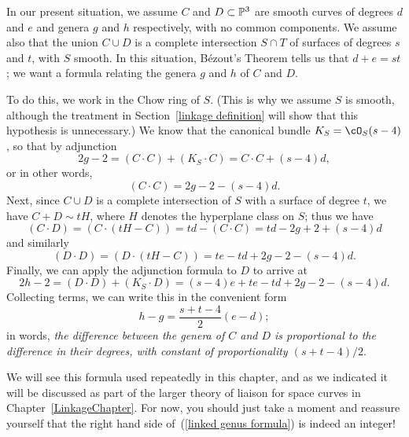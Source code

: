 In our present situation, we assume $C$ and $D \subset \PP^3$ are smooth curves of degrees $d$ and $e$ and genera $g$ and $h$ respectively, with no common components. We assume also that the union $C \cup D$ is a complete intersection $S \cap T$ of surfaces of degrees $s$ and $t$, with $S$ smooth. In this situation, B\'ezout's Theorem tells us that $d+e = st$; we want a formula relating the genera $g$ and $h$ of $C$ and $D$.

To do this, we work in the Chow ring of $S$. (This is why we assume $S$ is smooth, although the treatment in Section~\ref{linkage definition} will show that this hypothesis is unnecessary.) We know that the canonical bundle $K_S = \cO_S(s-4)$, so that by adjunction 
$$
2g-2 = (C\cdot C) + (K_S\cdot C) = C\cdot C + (s-4)d, 
$$
or in other words,
$$
(C \cdot C) = 2g-2 - (s-4)d.
$$
Next, since $C \cup D$ is a complete intersection of $S$ with a surface of degree $t$, we have $C + D\sim tH$, where $H$ denotes the hyperplane class on $S$; thus we have
$$
(C \cdot D) = (C \cdot (tH - C)) = td - (C \cdot C) = td - 2g + 2 + (s-4)d
$$
and similarly
$$
(D \cdot D) = (D \cdot (tH - C)) = te - td + 2g - 2 - (s-4)d.
$$
Finally, we can apply the adjunction formula to $D$ to arrive at
$$
2h - 2 = (D \cdot D) + (K_S \cdot D) = (s-4)e  + te - td + 2g - 2 - (s-4)d.
$$
Collecting terms, we can write this in the convenient form
\begin{equation}\label{linked genus formula}
h - g = \frac{s+t-4}{2}(e-d);
\end{equation}
in words, \emph{the difference between the genera of $C$ and $D$ is proportional to the difference in their degrees, with constant of proportionality $(s+t-4)/2$}. 

We will see this formula used repeatedly in this chapter, and as we indicated it will be discussed as part of the larger theory of liaison for space curves in Chapter~\ref{LinkageChapter}. For now, you should just take a moment and reassure yourself that the right hand side of~(\ref{linked genus formula}) is indeed an integer!

